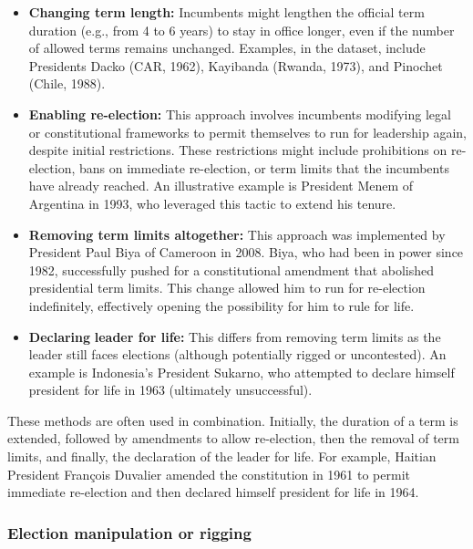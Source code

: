 \documentclass[
  12pt,
]{report}
\begin{document}
\begin{itemize}
\item
  \textbf{Changing term length:} Incumbents might lengthen the official
  term duration (e.g., from 4 to 6 years) to stay in office longer, even
  if the number of allowed terms remains unchanged. Examples, in the
  dataset, include Presidents Dacko (CAR, 1962), Kayibanda (Rwanda,
  1973), and Pinochet (Chile, 1988).
\item
  \textbf{Enabling re-election:} This approach involves incumbents
  modifying legal or constitutional frameworks to permit themselves to
  run for leadership again, despite initial restrictions. These
  restrictions might include prohibitions on re-election, bans on
  immediate re-election, or term limits that the incumbents have already
  reached. An illustrative example is President Menem of Argentina in
  1993, who leveraged this tactic to extend his tenure.
\item
  \textbf{Removing term limits altogether:} This approach was
  implemented by President Paul Biya of Cameroon in 2008. Biya, who had
  been in power since 1982, successfully pushed for a constitutional
  amendment that abolished presidential term limits. This change allowed
  him to run for re-election indefinitely, effectively opening the
  possibility for him to rule for life.
\item
  \textbf{Declaring} \textbf{leader for life:} This differs from
  removing term limits as the leader still faces elections (although
  potentially rigged or uncontested). An example is Indonesia's
  President Sukarno, who attempted to declare himself president for life
  in 1963 (ultimately unsuccessful).
\end{itemize}

These methods are often used in combination. Initially, the duration of
a term is extended, followed by amendments to allow re-election, then
the removal of term limits, and finally, the declaration of the leader
for life. For example, Haitian President François Duvalier amended the
constitution in 1961 to permit immediate re-election and then declared
himself president for life in 1964.

\subsubsection*{Election manipulation or
rigging}\label{election-manipulation-or-rigging}
\end{document}

